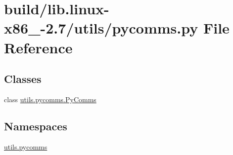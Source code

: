\hypertarget{build_2lib_8linux-x86__64-2_87_2utils_2pycomms_8py}{}\section{build/lib.linux-\/x86\+\_-\/2.7/utils/pycomms.py File Reference}
\label{build_2lib_8linux-x86__64-2_87_2utils_2pycomms_8py}
\subsection*{Classes}
\begin{DoxyCompactItemize}
\item 
class \hyperlink{classutils_1_1pycomms_1_1PyComms}{utils.\+pycomms.\+Py\+Comms}
\end{DoxyCompactItemize}
\subsection*{Namespaces}
\begin{DoxyCompactItemize}
\item 
 \hyperlink{namespaceutils_1_1pycomms}{utils.\+pycomms}
\end{DoxyCompactItemize}

